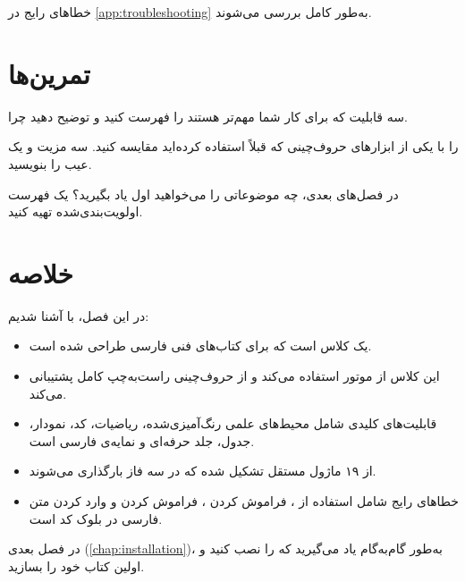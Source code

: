 
خطاهای رایج در \cref{app:troubleshooting}
به‌طور کامل بررسی می‌شوند.

\section{تمرین‌ها}
\label{sec:introduction-exercises}

\begin{exercise}
    سه قابلیت  که برای کار شما
    مهم‌تر هستند را فهرست کنید و توضیح دهید
    چرا.
    \label{exc:introduction-features}
\end{exercise}

\begin{exercise}
     را با یکی از ابزارهای
    حروف‌چینی که قبلاً استفاده کرده‌اید
    مقایسه کنید. سه مزیت و یک عیب
     را بنویسید.
    \label{exc:introduction-compare}
\end{exercise}

\begin{exercise}
    در فصل‌های بعدی، چه موضوعاتی را می‌خواهید
    اول یاد بگیرید؟ یک فهرست اولویت‌بندی‌شده
    تهیه کنید.
    \label{exc:introduction-priority}
\end{exercise}

\section{خلاصه}
\label{sec:introduction-summary}

در این فصل، با  آشنا شدیم:

\begin{itemize}
    \item {} یک کلاس 
    است که برای کتاب‌های فنی فارسی طراحی
    شده است.

    \item این کلاس از موتور 
    استفاده می‌کند و از حروف‌چینی راست‌به‌چپ
    کامل پشتیبانی می‌کند.

    \item قابلیت‌های کلیدی شامل محیط‌های علمی
    رنگ‌آمیزی‌شده، ریاضیات، کد، نمودار، جدول،
    جلد حرفه‌ای و نمایه‌ی فارسی است.

    \item {} از ۱۹ ماژول مستقل
    تشکیل شده که در سه فاز بارگذاری
    می‌شوند.

    \item خطاهای رایج شامل استفاده از
    ، فراموش کردن
    ، فراموش کردن
     و وارد کردن متن فارسی در
    بلوک کد است.
\end{itemize}

در فصل بعدی (\cref{chap:installation})،
به‌طور گام‌به‌گام یاد می‌گیرید که
 را نصب کنید و اولین کتاب
خود را بسازید.